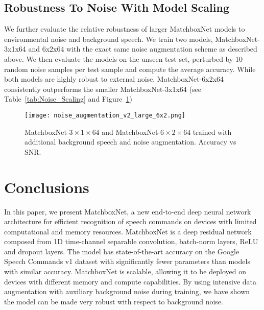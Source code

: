 \documentclass[a4paper]{article}
\begin{document}
\subsection{Robustness To Noise With Model Scaling}

We further evaluate the relative robustness of larger MatchboxNet models to environmental noise and background speech. We train two models, MatchboxNet-3x1x64 and 6x2x64 with the exact same noise augmentation scheme as described above. We then evaluate the models on the unseen test set, perturbed by 10 random noise samples per test sample and compute the average accuracy. While both models are highly robust to external noise, MatchboxNet-6x2x64 consistently outperforms the smaller MatchboxNet-3x1x64 (see Table~\ref{tab:Noise_Scaling} and Figure~\ref{fig:noise_scaling_fig})

{\renewcommand{\arraystretch}{1.1}
\begin{table}[!h]
\caption{MatchboxNet-$3\times1\times64$ and MatchboxNet-$6\times2\times64$ trained with additional background speech and noise augmentation. Accuracy (\%) is averaged over 10 trials with random noise.}
\label{tab:Noise_Scaling}
\centering
{}
\end{table}
}

\begin{figure}[htb!]
  \centering
  \texttt{[image: noise\_augmentation\_v2\_large\_6x2.png]}
  \caption{MatchboxNet-$3\times1\times64$ and MatchboxNet-$6\times2\times64$ trained with additional background speech and noise augmentation. Accuracy vs SNR.}
  \label{fig:noise_scaling_fig}
\end{figure}


\section{Conclusions}
In this paper, we present MatchboxNet, a new end-to-end deep neural network architecture for efficient recognition of speech commands on devices with limited computational and memory resources. MatchboxNet is a deep residual network composed from 1D time-channel separable convolution, batch-norm layers, ReLU and dropout layers.
The model has state-of-the-art accuracy on the Google Speech Commands v1 dataset with significantly fewer parameters than models with similar accuracy. MatchboxNet is  scalable, allowing it to be deployed on devices with different memory and compute capabilities. By using intensive data augmentation with auxiliary background noise during training, we have shown the model can be made very robust with respect to background noise.
\end{document}
